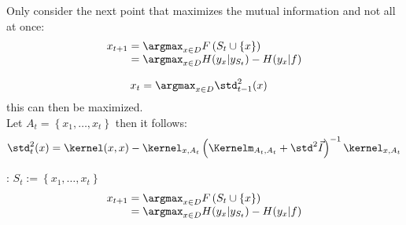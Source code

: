 \begin{defnbox}\nospacing
  \begin{defn}\label{defn:greedy_mutual_information_maximization_objective}
    Only consider the next point that maximizes the mutual information and not all at once:
    \begin{align}
          x_{t+1}&=\argmax_{x\in D}F \left(S_{t}\cup \left\{x\right\}\right)\nonumber\\[-1\jot]
                 &=\argmax_{x\in D}H(y_x|y_{S_t})-H(y_x|f)\label{eq:greedy_mutual_information_maximization_objective}
    \end{align}
  \end{defn}
\end{defnbox}
\begin{corbox}\nospacing
  \begin{cor}\label{cor:mutal_information_maximization_homoscedactic_gaussian}
    \begin{align}
      x_{t}&=\argmax_{x\in D}\std_{t-1}^2(x)\label{eq:mutal_information_maximization_homoscedactic_gaussian}
    \end{align}
    this can then be maximized.\\
    Let $A_{t}=\left\{x_{1},\ldots,x_{t}\right\}$ then it follows:
    \begin{align}
      \std^2_t(x)=\kernel(x,x)-\kernel_{x,A_t}\left(\Kernelm_{A_t,A_t}+\std^2\vec{I}\right)^{-1}\kernel_{x,A_t}
    \end{align}
  \end{cor}
\end{corbox}
\begin{algorithmbox}
  \begin{algo}\label{algo:greedy_mutual_information_maximization}
    \begin{algorithmic}[1]
      \item[] : $S_{t}:=\left\{x_{1},\ldots,x_{t}\right\}$
        \begin{align*}
          x_{t+1}&=\argmax_{x\in D}F \left(S_{t}\cup \left\{x\right\}\right)\\[-1\jot]
                 &=\argmax_{x\in D}H(y_x|y_{S_t})-H(y_x|f)
        \end{align*}
      \EndFor
    \end{algorithmic}
  \end{algo}
\end{algorithmbox}
